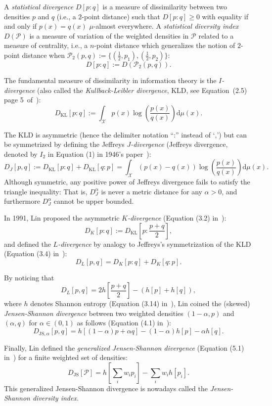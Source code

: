 \documentclass[11pt]{article}
\def\dmu{\mathrm{d}\mu}
\def\calX{\mathcal{X}}
\def\KL{\mathrm{KL}}
\def\calX{\mathcal{X}}
\def\calP{\mathcal{P}}
\def\dmu{\mathrm{d}\mu}
\def\KL{\mathrm{KL}}
\def\JS{\mathrm{JS}}
\begin{document}
A {\em statistical divergence} $D[p:q]$ is a measure of dissimilarity between two densities $p$ and $q$ (i.e., a $2$-point distance) such that $D[p:q]\geq 0$ with equality if and only if $p(x)=q(x)$ $\mu$-almost everywhere.
A {\em statistical diversity index} $D(\calP)$ is a measure of variation of the weighted densities in $\calP$ related to a measure of centrality, i.e., a $n$-point distance which generalizes the notion of $2$-point distance when $\calP_2(p,q):=\{(\frac{1}{2},p_1),(\frac{1}{2},p_2)\}$:
$$
D[p:q]:=D(\calP_2(p,q)).
$$

The fundamental measure of dissimilarity in information theory is the {\em $I$-divergence} (also called the {\em Kullback-Leibler divergence}, KLD,  see Equation~(2.5) page 5~of~\cite{Kullback-1997}):
$$
D_\KL[p:q]:=  \int_\calX p(x)\log\left(\frac{p(x)}{q(x)}\right)\dmu(x).
$$

The KLD is asymmetric (hence the delimiter notation ``:'' instead of `,') but can be symmetrized by defining the Jeffreys {\em $J$-divergence} (Jeffreys divergence, denoted by $I_2$ in Equation (1) in 1946's paper~\cite{Jeffreys-1946}):
$$
D_J[p,q] := D_\KL[p:q]+D_\KL[q:p] = \int_\calX (p(x)-q(x))\log\left(\frac{p(x)}{q(x)}\right)\dmu(x).
$$
Although symmetric, any positive power of Jeffreys divergence fails to satisfy the triangle inequality: 
That is, $D_J^\alpha$ is never a metric distance for any $\alpha>0$, and furthermore $D_J^\alpha$  cannot be upper bounded.

In 1991, Lin proposed the asymmetric {\em $K$-divergence} (Equation (3.2) in~\cite{JS-1991}):
$$
D_K[p:q]:=D_\KL\left[p:\frac{p+q}{2}\right],
$$
and defined the {\em $L$-divergence} by analogy to Jeffreys's symmetrization of the KLD (Equation (3.4) in~\cite{JS-1991}):
$$
D_L[p,q]=D_K[p:q]+D_K[q:p].
$$

By noticing that 
$$
D_L[p,q]= 2 h\left[\frac{p+q}{2}\right]-(h[p]+h[q]),
$$ 
where $h$ denotes Shannon entropy (Equation (3.14) in~\cite{JS-1991}), Lin coined the (skewed) {\em Jensen-Shannon divergence} between two weighted densities $(1-\alpha,p)$ and $(\alpha,q)$ for $\alpha\in(0,1)$ as follows (Equation (4.1) in~\cite{JS-1991}):
\begin{equation}\label{eq:JSh}
D_{\JS,\alpha}[p,q]=h[(1-\alpha)p+\alpha q]-(1-\alpha)h[p]-\alpha h[q].
\end{equation}

Finally, Lin defined the {\em generalized Jensen-Shannon divergence} (Equation (5.1) in~\cite{JS-1991}) for a finite weighted set of densities:
$$
D_\JS[\calP]=h\left[\sum_i w_ip_i\right]-\sum_i w_i h[p_i].
$$
This generalized Jensen-Shannon divergence is nowadays called the {\em Jensen-Shannon diversity index}.
\end{document}
